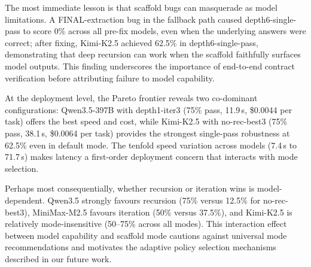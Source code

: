 \documentclass[11pt]{article}
\begin{document}
The most immediate lesson is that scaffold bugs can masquerade as model limitations. A FINAL-extraction bug in the fallback path caused depth6-single-pass to score 0\% across all pre-fix models, even when the underlying answers were correct; after fixing, Kimi-K2.5 achieved 62.5\% in depth6-single-pass, demonstrating that deep recursion can work when the scaffold faithfully surfaces model outputs. This finding underscores the importance of end-to-end contract verification before attributing failure to model capability.

At the deployment level, the Pareto frontier reveals two co-dominant configurations: Qwen3.5-397B with depth1-iter3 (75\% pass, 11.9\,s, \$0.0044 per task) offers the best speed and cost, while Kimi-K2.5 with no-rec-best3 (75\% pass, 38.1\,s, \$0.0064 per task) provides the strongest single-pass robustness at 62.5\% even in default mode. The tenfold speed variation across models (7.4\,s to 71.7\,s) makes latency a first-order deployment concern that interacts with mode selection.

Perhaps most consequentially, whether recursion or iteration wins is model-dependent. Qwen3.5 strongly favours recursion (75\% versus 12.5\% for no-rec-best3), MiniMax-M2.5 favours iteration (50\% versus 37.5\%), and Kimi-K2.5 is relatively mode-insensitive (50--75\% across all modes). This interaction effect between model capability and scaffold mode cautions against universal mode recommendations and motivates the adaptive policy selection mechanisms described in our future work.



\end{document}
